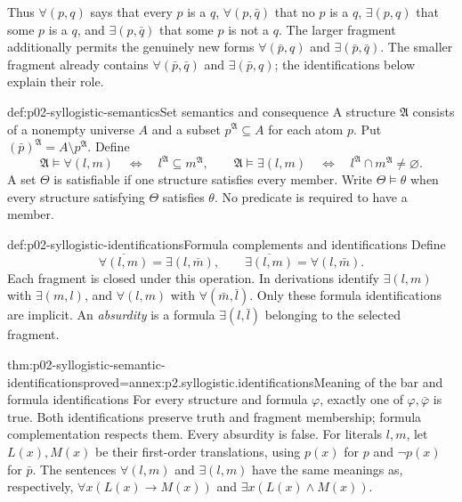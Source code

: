 Thus \(\forall(p,q)\) says that every \(p\) is a \(q\),
\(\forall(p,\bar q)\) that no \(p\) is a \(q\),
\(\exists(p,q)\) that some \(p\) is a \(q\), and
\(\exists(p,\bar q)\) that some \(p\) is not a \(q\).
The larger fragment additionally permits the genuinely new forms
\(\forall(\bar p,q)\) and \(\exists(\bar p,\bar q)\).
The smaller fragment already contains \(\forall(\bar p,\bar q)\) and
\(\exists(\bar p,q)\); the identifications below explain their role.

\begin{hbdefinition}{def:p02-syllogistic-semantics}{Set semantics and consequence}
A structure \(\mathfrak A\) consists of a nonempty universe \(A\) and a subset
\(p^{\mathfrak A}\subseteq A\) for each atom \(p\). Put
\((\bar p)^{\mathfrak A}=A\setminus p^{\mathfrak A}\). Define
\[
 \mathfrak A\models\forall(l,m)
 \quad\Longleftrightarrow\quad l^{\mathfrak A}\subseteq m^{\mathfrak A},
 \qquad
 \mathfrak A\models\exists(l,m)
 \quad\Longleftrightarrow\quad
 l^{\mathfrak A}\cap m^{\mathfrak A}\ne\varnothing.
\]
A set \(\Theta\) is satisfiable if one structure satisfies every member.
Write \(\Theta\models\theta\) when every structure satisfying \(\Theta\)
satisfies \(\theta\). No predicate is required to have a member.
\end{hbdefinition}

\begin{hbdefinition}{def:p02-syllogistic-identifications}{Formula complements and identifications}
Define
\[
 \overline{\forall(l,m)}=\exists(l,\bar m),\qquad
 \overline{\exists(l,m)}=\forall(l,\bar m).
\]
Each fragment is closed under this operation. In derivations identify
\(\exists(l,m)\) with \(\exists(m,l)\), and
\(\forall(l,m)\) with \(\forall(\bar m,\bar l)\).
Only these formula identifications are implicit. An \emph{absurdity} is a
formula \(\exists(l,\bar l)\) belonging to the selected fragment.
\end{hbdefinition}

\begin{hblemma}{thm:p02-syllogistic-semantic-identifications}{proved=annex:p2.syllogistic.identifications}{Meaning of the bar and formula identifications}
For every structure and formula \(\varphi\), exactly one of
\(\varphi,\bar\varphi\) is true. Both identifications preserve truth and
fragment membership; formula complementation respects them. Every absurdity
is false. For literals \(l,m\), let \(L(x),M(x)\) be their first-order
translations, using \(p(x)\) for \(p\) and \(\neg p(x)\) for \(\bar p\).
The sentences \(\forall(l,m)\) and \(\exists(l,m)\) have the same meanings
as, respectively,
\(\forall x(L(x)\to M(x))\) and
\(\exists x(L(x)\land M(x))\).
\end{hblemma}

